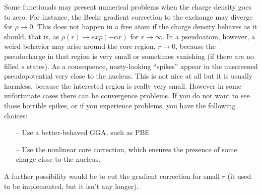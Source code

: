 \documentclass[12pt,a4paper]{article}
\begin{document}
Some functionals may present numerical problems
when the charge density goes to zero. For instance, the Becke
gradient correction to the exchange may diverge for 
$\rho \rightarrow 0$. This does not happen in a free atom
if the charge density behaves as it should, that is, as
$\rho(r)\rightarrow exp(-\alpha r)$ for $r \rightarrow \infty$.
In a pseudoatom, however, a weird behavior may arise 
around the core region, $r\rightarrow 0$, because the 
pseudocharge in that region is very small or sometimes 
vanishing (if there are no filled $s$ states). As a consequence,
nasty-looking ``spikes'' appear in the unscreened pseudopotential
very close to the nucleus. This is not nice at all but it is
usually harmless, because the interested region is really 
very small. However in some unfortunate cases there can be 
convergence problems. If you do not want to see those horrible 
spikes, or if you experience problems, you have the following
choices:
\begin{enumerate}
\item[--] Use a better-behaved GGA, such as PBE
\item[--] Use the nonlinear core correction, which ensures
          the presence of some charge close to the nucleus.
\end{enumerate}
A further possibility would be to cut the gradient correction for small 
$r$ (it used to be implemented, but it isn't any longer).
\end{document}
